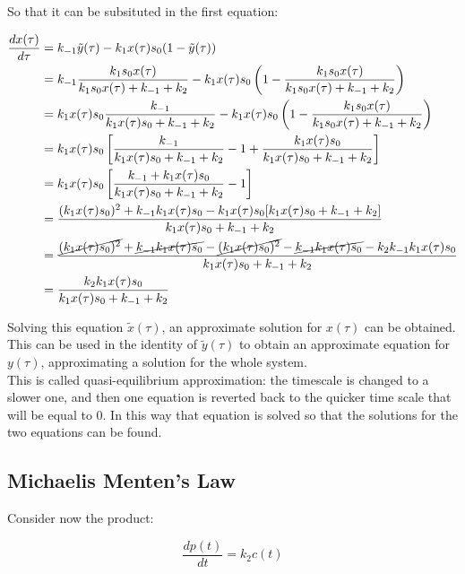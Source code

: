   So that it can be subsituted in the first equation:

  \begin{align*}
    \frac{dx(\tau)}{d\tau} &= k_{-1}\tilde{y}(\tau) - k_1x(\tau)s_0(1-\tilde{y}(\tau))\\
                           &= k_{-1}\frac{k_1s_0x(\tau)}{k_1s_0x(\tau)+k_{-1}+k_2} - k_1x(\tau)s_0\left(1-\frac{k_1s_0x(\tau)}{k_1s_0x(\tau)+k_{-1}+k_2}\right)\\
                           &= k_1x(\tau)s_0\frac{k_{-1}}{k_1x(\tau)s_0+k_{-1}+k_2} - k_1x(\tau)s_0\left(1-\frac{k_1s_0x(\tau)}{k_1s_0x(\tau)+k_{-1}+k_2}\right)\\
                           &= k_1x(\tau)s_0\left[\frac{k_{-1}}{k_1x(\tau)s_0+k_{-1}+k_2}-1+\frac{k_1x(\tau)s_0}{k_1x(\tau)s_0+k_{-1}+k_2}\right]\\
                           &= k_1x(\tau)s_0\left[\frac{k_{-1} + k_1x(\tau)s_0}{k_1x(\tau)s_0+k_{-1}+k_2}-1\right]\\
                           &= \frac{(k_1x(\tau)s_0)^2+k_{-1}k_1x(\tau)s_0 - k_1x(\tau)s_0[k_1x(\tau)s_0 + k_{-1} + k_2]}{k_1x(\tau)s_0+k_{-1}+k_2}\\
                           &= \frac{\cancel{(k_1x(\tau)s_0)^2}+\cancel{k_{-1}k_1x(\tau)s_0} - \cancel{(k_1x(\tau)s_0)^2} - \cancel{k_{-1}k_1x(\tau)s_0} - k_2k_{-1}k_1x(\tau)s_0}{k_1x(\tau)s_0+k_{-1}+k_2}\\
                           &= \frac{k_2k_1x(\tau)s_0}{k_1x(\tau)s_0+k_{-1}+k_2}\\
  \end{align*}

  Solving this equation $\tilde{x}(\tau)$, an approximate solution for $x(\tau)$ can be obtained.
  This can be used in the identity of $\tilde{y}(\tau)$ to obtain an approximate equation for $y(\tau)$, approximating a solution for the whole system.\\
  This is called quasi-equilibrium approximation: the timescale is changed to a slower one, and then one equation is reverted back to the quicker time scale that will be equal to $0$.
  In this way that equation is solved so that the solutions for the two equations can be found.

  \subsection{Michaelis Menten's Law}
  Consider now the product:

  $$\frac{dp(t)}{dt} = k_2c(t)$$

